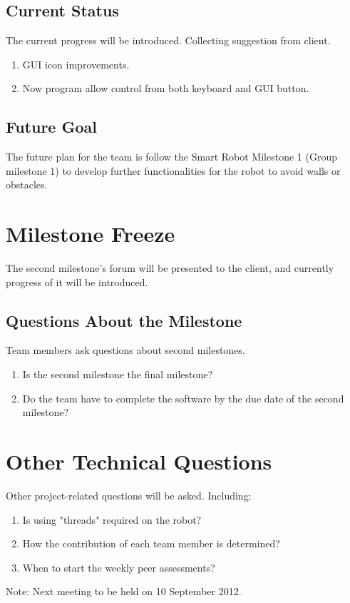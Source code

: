 \documentclass[11pt, a4paper]{article}
\begin{document}
\subsection{Current Status}
The current progress will be introduced. Collecting suggestion from client.
\begin{enumerate}
	\item GUI icon improvements.
	\item Now program allow control from both keyboard and GUI button. 
\end{enumerate}
\subsection{Future Goal}
The future plan for the team is follow the Smart Robot Milestone 1 (Group milestone 1) to develop further functionalities for the robot to avoid walls or obstacles.

\section{Milestone Freeze}
The second milestone's forum will be presented to the client, and currently progress of it will be introduced.
\subsection{Questions About the Milestone}
Team members ask questions about second milestones. 
\begin{enumerate}
	\item Is the second milestone the final milestone? 
	\item Do the team have to complete the software by the due date of the second milestone?
\end{enumerate}

\section{Other Technical Questions}
Other project-related questions will be asked. Including: 
\begin{enumerate}
	\item Is using "threads" required on the robot? 
	\item How the contribution of each team member is determined? 
	\item When to start the weekly peer assessments? 
\end{enumerate}



\vspace*{10pt}
\noindent Note: Next meeting to be held on 10 September 2012.
\end{document}
